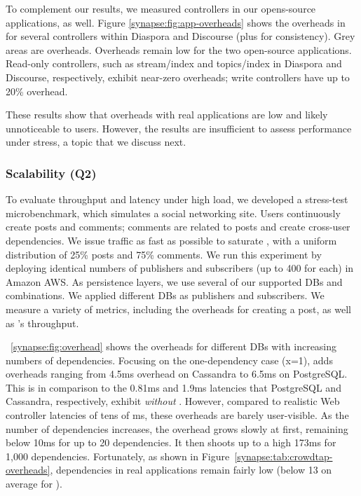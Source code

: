 To complement our \crowdtap results, we measured controllers in our opens-source
applications, as well. Figure \ref{synapse:fig:app-overheads} shows the \synapse
overheads in for several controllers within Diaspora and Discourse (plus
\crowdtap for consistency). Grey areas are \synapse overheads. Overheads
remain low for the two open-source applications. Read-only controllers, such as
{\code stream/index} and {\code topics/index} in Diaspora and Discourse,
respectively, exhibit near-zero overheads; write controllers have up to 20\%
overhead.

These results show that \synapse overheads with real applications are low and
likely unnoticeable to users. However, the results are insufficient to assess
performance under stress, a topic that we discuss next.

\subsubsection{Scalability (Q2)}
\label{synapse:sec:evaluation:scalability}

To evaluate \synapse throughput and latency under high load, we developed a
stress-test microbenchmark, which simulates a social networking site. Users
continuously create posts and comments; comments are related to posts and create
cross-user dependencies. We issue traffic as fast as possible to saturate \synapse, with a
uniform distribution of 25\% posts and 75\% comments. We run this experiment
by deploying identical numbers of publishers and subscribers (up to 400 for
each) in Amazon AWS. As persistence layers, we use several of our supported
DBs and combinations. We applied different DBs as publishers and
subscribers. We measure a variety of metrics, including the overheads for
creating a post, as well as \synapse's throughput.

\F~\ref{synapse:fig:overhead} shows the overheads for different DBs with increasing
numbers of dependencies. Focusing on the one-dependency case (x=1), \synapse
adds overheads ranging from 4.5ms overhead on Cassandra to 6.5ms on PostgreSQL.
This is in comparison to the 0.81ms and 1.9ms latencies that PostgreSQL and
Cassandra, respectively, exhibit {\em without} \synapse. However, compared to
realistic Web controller latencies of tens of ms, these overheads are barely
user-visible. As the number of dependencies increases, the overhead grows slowly
at first, remaining below 10ms for up to 20 dependencies. It then shoots up to a
high 173ms for 1,000 dependencies. Fortunately, as shown in
Figure~\ref{synapse:tab:crowdtap-overheads}, dependencies in real applications remain
fairly low (below 13 on average for \crowdtap).

